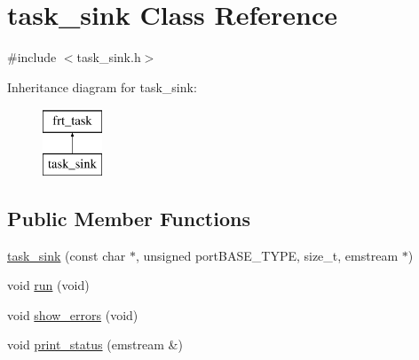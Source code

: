 \hypertarget{classtask__sink}{\section{task\+\_\+sink Class Reference}
\label{classtask__sink}
}


{\ttfamily \#include $<$task\+\_\+sink.\+h$>$}

Inheritance diagram for task\+\_\+sink\+:\begin{figure}[H]
\begin{center}
\leavevmode
\includegraphics[height=2.000000cm]{classtask__sink}
\end{center}
\end{figure}
\subsection*{Public Member Functions}
\begin{DoxyCompactItemize}
\item 
\hyperlink{classtask__sink_af0700c1b88de258c45dd3a65f91ac5d0}{task\+\_\+sink} (const char $\ast$, unsigned port\+B\+A\+S\+E\+\_\+\+T\+Y\+P\+E, size\+\_\+t, emstream $\ast$)
\item 
void \hyperlink{classtask__sink_a90497d9f3e918301d3643181e6e8a42d}{run} (void)
\item 
void \hyperlink{classtask__sink_a13ab68837b0138fb6dbd488dff4e6175}{show\+\_\+errors} (void)
\item 
void \hyperlink{classtask__sink_a16c0c8249299c81490190d0a2a13f7ee}{print\+\_\+status} (emstream \&)
\end{DoxyCompactItemize}
